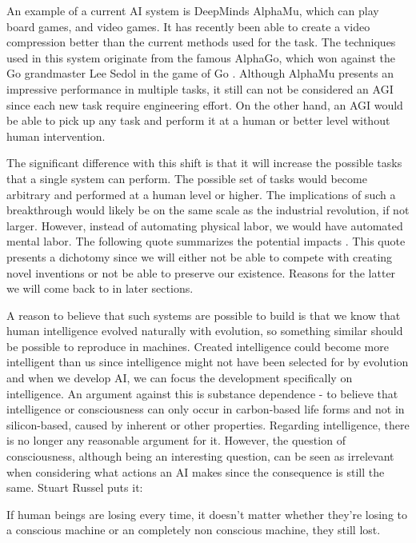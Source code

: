 \documentclass[12pt,A4]{report}
\theoremstyle{definition}
\begin{document}
An example of a current AI system is DeepMinds AlphaMu, which can play board games, and video games. It has recently been able to create a video compression better than the current methods used for the task\autocite{Mandhane}. The techniques used in this system originate from the famous AlphaGo, which won against the Go grandmaster Lee Sedol in the game of Go \autocite{DeepMind}. Although AlphaMu presents an impressive performance in multiple tasks, it still can not be considered an AGI since each new task require engineering effort. On the other hand, an AGI would be able to pick up any task and perform it at a human or better level without human intervention.

The significant difference with this shift is that it will increase the possible tasks that a single system can perform. The possible set of tasks would become arbitrary and performed at a human level or higher. The implications of such a breakthrough would likely be on the same scale as the industrial revolution, if not larger\autocite{Critch Kruger}. However, instead of automating physical labor, we would have automated mental labor. The following quote summarizes the potential impacts \autocite{I.J Good}. This quote presents a dichotomy since we will either not be able to compete with creating novel inventions or not be able to preserve our existence. Reasons for the latter we will come back to in later sections. 

A reason to believe that such systems are possible to build is that we know that human intelligence evolved naturally with evolution, so something similar should be possible to reproduce in machines. Created intelligence could become more intelligent than us since intelligence might not have been selected for by evolution\autocite{S. Legg} and when we develop AI, we can focus the development specifically on intelligence. An argument against this is substance dependence \autocite{Bostrom (2003)} - to believe that intelligence or consciousness can only occur in carbon-based life forms and not in silicon-based, caused by inherent or other properties. Regarding intelligence, there is no longer any reasonable argument for it. However, the question of consciousness, although being an interesting question, can be seen as irrelevant when considering what actions an AI makes since the consequence is still the same. Stuart Russel puts it: 
\begin{displayquote}
If human beings are losing every time, it doesn't matter whether they're losing to a conscious machine or an completely non conscious machine, they still lost.
\end{displayquote}
\end{document}
